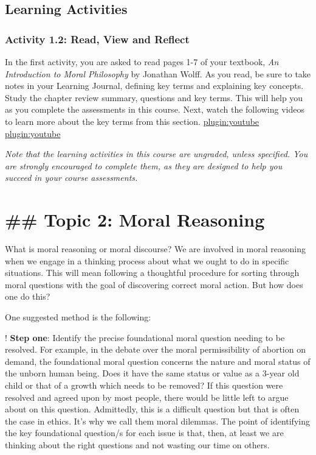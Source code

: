 \documentclass[
]{book}
\begin{document}
\hypertarget{learning-activities-4}{%
\subsection{Learning Activities}\label{learning-activities-4}}

\hypertarget{activity-1.2-read-view-and-reflect-1}{%
\subsubsection{Activity 1.2: Read, View and Reflect}\label{activity-1.2-read-view-and-reflect-1}}

In the first activity, you are asked to read pages 1-7 of your textbook, \emph{An Introduction to Moral Philosophy} by Jonathan Wolff. As you read, be sure to take notes in your Learning Journal, defining key terms and explaining key concepts. Study the chapter review summary, questions and key terms. This will help you as you complete the assessments in this course.
Next, watch the following videos to learn more about the key terms from this section.
\href{https://www.youtube.com/watch?v=NKEhdsnKKHs}{plugin:youtube}
\href{https://www.youtube.com/watch?v=FOoffXFpAlU}{plugin:youtube}

\emph{Note that the learning activities in this course are ungraded, unless specified. You are strongly encouraged to complete them, as they are designed to help you succeed in your course assessments.}

\hypertarget{topic-2-moral-reasoning-1}{%
\section{\#\# Topic 2: Moral Reasoning}\label{topic-2-moral-reasoning-1}}

What is moral reasoning or moral discourse? We are involved in moral reasoning
when we engage in a thinking process about what we ought to do in specific
situations. This will mean following a thoughtful procedure for sorting through
moral questions with the goal of discovering correct moral action. But how does
one do this?

One suggested method is the following:

! \textbf{Step one}: Identify the precise foundational moral question needing to be resolved. For example, in the debate over the moral permissibility of abortion on demand, the foundational moral question concerns the nature and moral status of the unborn human being. Does it have the same status or value as a 3-year old child or that of a growth which needs to be removed? If this question were resolved and agreed upon by most people, there would be little left to argue about on this question. Admittedly, this is a difficult question but that is often the case in ethics. It's why we call them moral dilemmas. The point of identifying the key foundational question/s for each issue is that, then, at least we are thinking about the right questions and not wasting our time on others.
\end{document}
